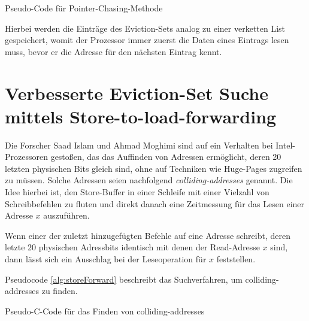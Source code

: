 \begin{algorithm}[h]
\DontPrintSemicolon
\caption{Pseudo-Code für Pointer-Chasing-Methode}
\label{alg:pointerChasing}

\end{algorithm}

Hierbei werden die Einträge des Eviction-Sets analog zu einer verketten List gespeichert, womit der Prozessor immer zuerst die Daten eines Eintrags lesen muss, bevor er die Adresse für den nächsten Eintrag kennt.

\section{Verbesserte Eviction-Set Suche mittels Store-to-load-forwarding}
\label{StoreFor}

Die Forscher Saad Islam und Ahmad Moghimi \cite{TODO} sind auf ein Verhalten bei Intel-Prozessoren gestoßen, das das Auffinden von Adressen ermöglicht, deren 20 letzten physischen Bits gleich sind, ohne auf Techniken wie Huge-Pages zugreifen zu müssen.
Solche Adressen seien nachfolgend \textit{colliding-addresses} genannt.
Die Idee hierbei ist, den Store-Buffer in einer Schleife mit einer Vielzahl von Schreibbefehlen zu fluten und direkt danach eine Zeitmessung für das Lesen einer Adresse $x$ auszuführen.

Wenn einer der zuletzt hinzugefügten Befehle auf eine Adresse schreibt, deren letzte 20 physischen Adressbits identisch mit denen der Read-Adresse $x$ sind, dann lässt sich ein Ausschlag bei der Leseoperation für $x$ feststellen.

Pseudocode \ref{alg:storeForward} beschreibt das Suchverfahren, um colliding-addresses zu finden.

\begin{algorithm}[h]
\DontPrintSemicolon
\caption{Pseudo-C-Code für das Finden von colliding-addresses}
\label{alg:storeForward}

\end{algorithm}

